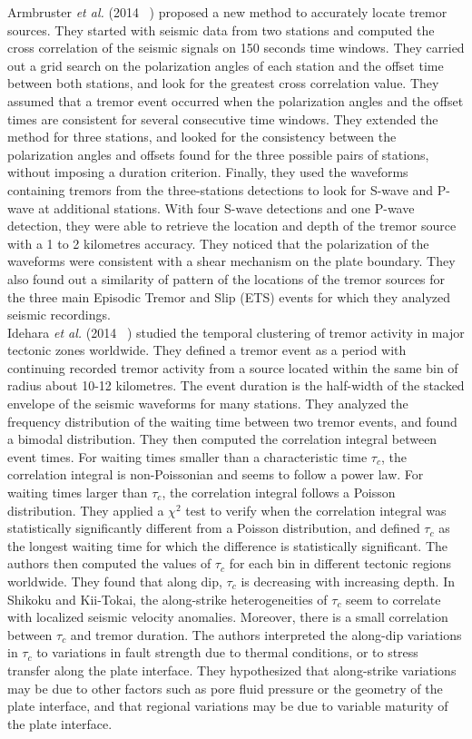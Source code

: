 \documentclass[main.tex]{subfiles}
\begin{document}
Armbruster \textit{et al.} (2014 ~\cite{ARM_2014}) proposed a new method to accurately locate tremor sources. They started with seismic data from two stations and computed the cross correlation of the seismic signals on 150 seconds time windows. They carried out a grid search on the polarization angles of each station and the offset time between both stations, and look for the greatest cross correlation value. They assumed that a tremor event occurred when the polarization angles and the offset times are consistent for several consecutive time windows. They extended the method for three stations, and looked for the consistency between the polarization angles and offsets found for the three possible pairs of stations, without imposing a duration criterion. Finally, they used the waveforms containing tremors from the three-stations detections to look for S-wave and P-wave at additional stations. With four S-wave detections and one P-wave detection, they were able to retrieve the location and depth of the tremor source with a 1 to 2 kilometres accuracy. They noticed that the polarization of the waveforms were consistent with a shear mechanism on the plate boundary. They also found out a similarity of pattern of the locations of the tremor sources for the three main Episodic Tremor and Slip (ETS) events for which they analyzed seismic recordings. \\

Idehara \textit{et al.} (2014 ~\cite{IDE_2014}) studied the temporal clustering of tremor activity in major tectonic zones worldwide. They defined a tremor event as a period with continuing recorded tremor activity from a source located within the same bin of radius about 10-12 kilometres. The event duration is the half-width of the stacked envelope of the seismic waveforms for many stations. They analyzed the frequency distribution of the waiting time between two tremor events, and found a bimodal distribution. They then computed the correlation integral between event times. For waiting times smaller than a characteristic time $\tau_c$, the correlation integral is non-Poissonian and seems to follow a power law. For waiting times larger than $\tau_c$, the correlation integral follows a Poisson distribution. They applied a $\chi^2$ test to verify when the correlation integral was statistically significantly different from a Poisson distribution, and defined $\tau_c$ as the longest waiting time for which the difference is statistically significant. The authors then computed the values of $\tau_c$ for each bin in different tectonic regions worldwide. They found that along dip, $\tau_c$ is decreasing with increasing depth. In Shikoku and Kii-Tokai, the along-strike heterogeneities of $\tau_c$ seem to correlate with localized seismic velocity anomalies. Moreover, there is a small correlation between $\tau_c$ and tremor duration. The authors interpreted the along-dip variations in $\tau_c$ to variations in fault strength due to thermal conditions, or to stress transfer along the plate interface. They hypothesized that along-strike variations may be due to other factors such as pore fluid pressure or the geometry of the plate interface, and that regional variations may be due to variable maturity of the plate interface. \\
\end{document}
